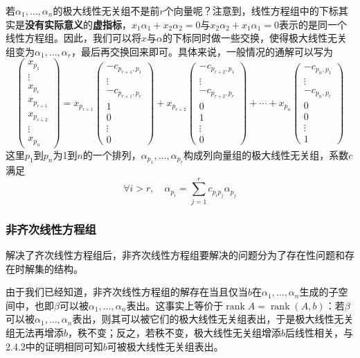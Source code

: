 \documentclass[a4paper,UTF8,fontset=windows]{ctexart}
\DeclareMathOperator{\rank}{rank}
\newcommand*{\note}{\noindent *}
\begin{document}
\note 若$\alpha_1,\dots,\alpha_n$的极大线性无关组不是前$r$个向量呢？注意到，线性方程组中的下标其实是\textbf{没有实际意义}的\textbf{虚指标}，$x_1\alpha_1+x_2\alpha_2=0$与$x_2\alpha_2+x_1\alpha_1=0$表示的是同一个线性方程组。因此，我们可以将$x$与$\alpha$的下标同时做一些交换，使得极大线性无关组变为$\alpha_1,\dots,\alpha_r$，最后再交换回来即可。具体来说，一般情况的通解可以写为
$$\begin{pmatrix}x_{p_1}\\\vdots\\x_{p_r}\\x_{p_{r+1}}\\x_{p_{r+2}}\\\vdots\\x_{p_n}\end{pmatrix}=x_{p_{r+1}}\begin{pmatrix}-c_{p_{r+1},p_1}\\\vdots\\-c_{p_{r+1},p_r}\\1\\0\\\vdots\\0\end{pmatrix}+x_{p_{r+2}}\begin{pmatrix}-c_{p_{r+2},p_1}\\\vdots\\-c_{p_{r+2},p_r}\\0\\1\\\vdots\\0\end{pmatrix}+\cdots+x_{p_n}\begin{pmatrix}-c_{p_n,p_1}\\\vdots\\-c_{p_n,p_r}\\0\\0\\\vdots\\1\end{pmatrix}$$
这里$p_1$到$p_n$为1到$n$的一个排列，$\alpha_{p_1},\dots,\alpha_{p_r}$构成列向量组的极大线性无关组，系数$c$满足
$$\forall i>r,\quad\alpha_{p_i}=\sum_{j=1}^rc_{p_ip_j}\alpha_{p_j}$$

\subsubsection{非齐次线性方程组}
解决了齐次线性方程组后，非齐次线性方程组要解决的问题分为了存在性问题和存在时解集的结构。

由于我们已经知道，非齐次线性方程组的解存在当且仅当$b$在$\alpha_1,\dots,\alpha_n$生成的子空间中，也即$\beta$可以被$\alpha_1,\dots,\alpha_n$表出。这事实上等价于$\rank A=\rank (A,b)$：若$\beta$可以被$\alpha_1,\dots,\alpha_n$表出，则其可以被它们的极大线性无关组表出，于是极大线性无关组无法再增添$b$，秩不变；反之，若秩不变，极大线性无关组增添$b$后线性相关，与2.4.2中的证明相同可知$b$可被极大线性无关组表出。
\end{document}

